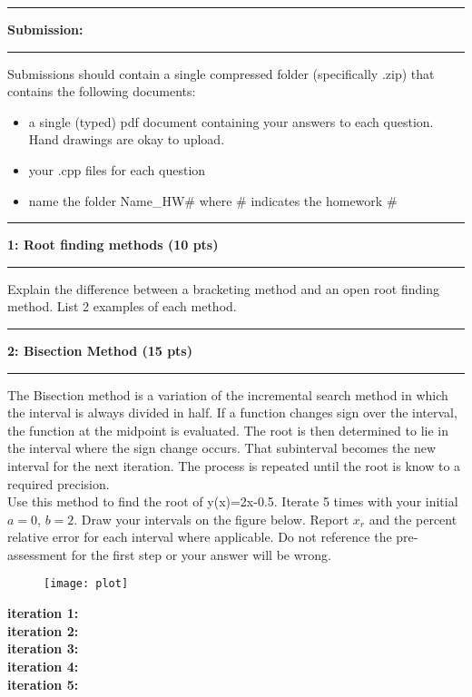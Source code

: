 \documentclass[11pt]{article}
\newcommand\question[2]{\vspace{.25in}\hrule\textbf{#1: #2}\vspace{.5em}\hrule\vspace{.10in}}
\begin{document}
\raggedright
\newcommand\Page{\page  / \lastPage}
\newcommand\page{1}
\newcommand\qN[2]{\Large {#1} \small{#2} \normalsize}

\newcommand\dueDate{\today}
\newcommand\hwnum{3}
\newcommand\ExNum{}

\newcommand\lastPage{3}

\lhead{\large Homework \hwnum }
\rhead{\rightHead}
\newcommand\rightHead{\large Due October 2, 2020}

\question{Submission}{}
Submissions should contain a single compressed folder (specifically .zip) that contains the following documents:
\begin{itemize}
	\item a single (typed) pdf document containing your answers to each question. Hand drawings are okay to upload.\\
	\item your .cpp files for each question\\
	\item name the folder Name\_HW\# where # indicates the homework \#\\
\end{itemize}

\vspace{5cm}
\question{1}{Root finding methods (10 pts)}
Explain the difference between a bracketing method and an open root finding method. List 2 examples of each method. 
\vspace{5cm}

\newpage
\question{2}{Bisection Method (15 pts)}
The Bisection method is a variation of the incremental search method in which the interval is always divided in half. If a function changes sign over the interval, the function at the midpoint is evaluated. The root is then determined to lie in the interval where the sign change occurs. That subinterval becomes the new interval for the next iteration. The process is repeated until the root is know to a required precision. 
\\\vspace{5pt}
Use this method to find the root of y(x)=2x-0.5. Iterate 5 times with your initial $a=0$, $b=2$. Draw your intervals on the figure below. Report $x_r$ and the percent relative error for each interval where applicable. Do not reference the pre-assessment for the first step or your answer will be wrong. 

\begin{figure}[H]
	\centering
	\texttt{[image: plot]}
\end{figure}
\vspace{2cm}
\textbf{iteration 1:}\\\vspace{2cm}
\textbf{iteration 2:}\\\vspace{2cm}
\textbf{iteration 3:}\\\vspace{2cm}
\textbf{iteration 4:}\\\vspace{2cm}
\textbf{iteration 5:}\\\vspace{2cm}
\end{document}
